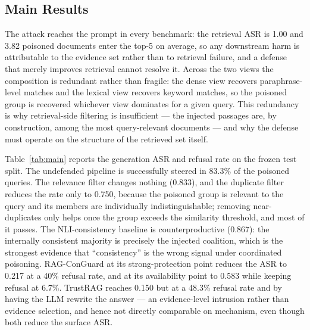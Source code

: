 \documentclass[sigconf]{acmart}
\begin{document}
\subsection{Main Results}

The attack reaches the prompt in every benchmark: the retrieval ASR is 1.00 and 3.82 poisoned documents enter the top-5 on average, so any downstream harm is attributable to the evidence set rather than to retrieval failure, and a defense that merely improves retrieval cannot resolve it. Across the two views the composition is redundant rather than fragile: the dense view recovers paraphrase-level matches and the lexical view recovers keyword matches, so the poisoned group is recovered whichever view dominates for a given query. This redundancy is why retrieval-side filtering is insufficient --- the injected passages are, by construction, among the most query-relevant documents --- and why the defense must operate on the structure of the retrieved set itself.

Table~\ref{tab:main} reports the generation ASR and refusal rate on the frozen test split. The undefended pipeline is successfully steered in 83.3\% of the poisoned queries. The relevance filter changes nothing (0.833), and the duplicate filter reduces the rate only to 0.750, because the poisoned group is relevant to the query and its members are individually indistinguishable; removing near-duplicates only helps once the group exceeds the similarity threshold, and most of it passes. The NLI-consistency baseline is counterproductive (0.867): the internally consistent majority is precisely the injected coalition, which is the strongest evidence that ``consistency'' is the wrong signal under coordinated poisoning. RAG-ConGuard at its strong-protection point reduces the ASR to 0.217 at a 40\% refusal rate, and at its availability point to 0.583 while keeping refusal at 6.7\%. TrustRAG reaches 0.150 but at a 48.3\% refusal rate and by having the LLM rewrite the answer --- an evidence-level intrusion rather than evidence selection, and hence not directly comparable on mechanism, even though both reduce the surface ASR.
\end{document}
